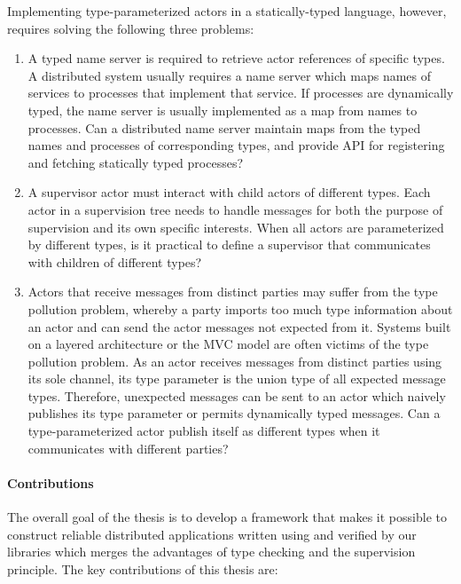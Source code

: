 Implementing type-parameterized actors in a statically-typed language, however, 
requires solving the following three problems:

\begin{enumerate}
  \item A typed name server is required to retrieve actor references of
specific types.  A distributed system usually requires a name server which
maps names of services to processes that implement that service.  If processes
are dynamically typed, the name server is usually implemented as a map from 
names to processes. Can a distributed name server maintain maps from the typed 
names and processes of corresponding types, and provide API for 
registering and fetching statically typed processes?

  \item A supervisor actor must interact with child actors of different types. 
Each actor in a supervision tree needs to handle messages for both the purpose 
of supervision and its own specific interests.  When all actors are 
parameterized by different types, is it practical to define a supervisor that 
communicates with children of different types?

  \item Actors that receive messages from distinct parties may suffer from the 
type pollution problem, whereby a party imports too much type information 
about an actor and can send the actor messages not expected from it. Systems 
built on a layered architecture or the MVC model are often victims of the type 
pollution problem. As an actor receives messages from distinct parties using its 
sole channel, its type parameter is the union type of all expected message 
types. Therefore, unexpected messages can be sent to an actor which naively 
publishes its type parameter or permits dynamically typed messages. Can a 
type-parameterized actor publish itself as different types when it communicates 
with different parties?
\end{enumerate}

\paragraph{Contributions}

The overall goal of the thesis is to develop a framework that makes it possible 
to construct reliable distributed applications written using and verified by 
our libraries which merges the advantages of type checking and the supervision 
principle.  The key contributions of this thesis are:

